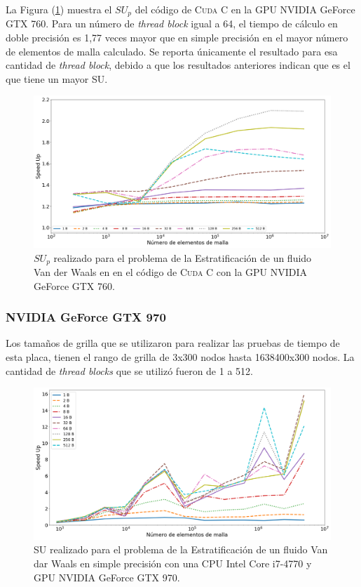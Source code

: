 La Figura (\ref{fig:c_760_VdW_cuda_10}) muestra el ${SU}_p$ del código de \textsc{Cuda C} en la GPU NVIDIA GeForce GTX 760. Para un número de \textit{thread block} igual a 64, el tiempo de cálculo en doble precisión es 1,77 veces mayor que en simple precisión en el mayor número de elementos de malla calculado. Se reporta únicamente el resultado para esa cantidad de \textit{thread block}, debido a que los resultados anteriores indican que es el que tiene un mayor SU.

\begin{figure}[h!]
	\centering
	\includegraphics[width=\textwidth]{figs/cap4/c_760_MxC_cuda_10}
	\caption{$SU_p$ realizado para el problema de la Estratificación de un fluido Van der Waals en en el código de \textsc{Cuda C} con la GPU NVIDIA GeForce GTX 760.} 
	\label{fig:c_760_VdW_cuda_10}	
\end{figure}

\newpage

\subsubsection{NVIDIA GeForce GTX 970}

Los tamaños de grilla que se utilizaron para realizar las pruebas de tiempo de esta placa, tienen el rango de grilla de 3x300 nodos hasta 1638400x300 nodos. La cantidad de \textit{thread blocks} que se utilizó fueron de 1 a 512.



\begin{figure}[h!]
	\centering
	\includegraphics[width=\textwidth]{figs/cap4/s_970_VdW_simple_10}
	\caption{SU realizado para el problema de la Estratificación de un fluido Van dar Waals en simple precisión con una CPU Intel Core i7-4770 y GPU NVIDIA GeForce GTX 970.} 
	\label{fig:s_970_VdW_simple_10}	
\end{figure}


